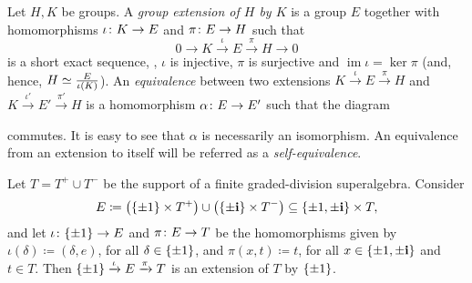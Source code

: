 \begin{defi}
	Let $H, K$ be groups.
	A \emph{group extension of $H$ by $K$} is a group $E$ together with homomorphisms $\iota\colon K \to E$ and $\pi\colon E \to H$ such that
	\begin{equation}\label{eq:short-exact-sequence}
		0 \rightarrow K \xrightarrow{\iota} E \xrightarrow{\pi} H \rightarrow 0
	\end{equation}
	is a short exact sequence, \ie,
	$\iota$ is injective, $\pi$ is surjective and $\operatorname{im} \iota = \ker \pi$ (and, hence, $H \simeq \frac{E}{\iota(K)}$).
	An \emph{equivalence} between two extensions $K \xrightarrow{\iota} E \xrightarrow{\pi} H$ and $K \xrightarrow{\iota'} E' \xrightarrow{\pi'} H$ is a homomorphism $\alpha\colon E \to E'$ such that the diagram
	\begin{center}
	\end{center}
	commutes.
	It is easy to see that $\alpha$ is necessarily an isomorphism.
	An equivalence from an extension to itself will be referred as a \emph{self-equivalence}.
\end{defi}

\begin{ex}\label{ex:main-extension}
    Let $T = T^+ \cup T^-$ be the support of a finite graded-division superalgebra.  Consider 
    \[
        E \coloneqq \big(\{ \pm 1 \} \times T^+\big) \cup \big(\{\pm \mathbf{i}\} \times T^-\big) \subseteq \{ \pm 1, \pm \mathbf{i} \} \times T,
    \] 
    and let $\iota\colon \{ \pm 1 \} \to E$ and $\pi\colon E \to T$ be the homomorphisms given by $\iota(\delta) \coloneqq (\delta, e)$, for all $\delta \in \{ \pm 1 \}$,  and $\pi (x, t) \coloneqq t$, for all $x \in \{ \pm 1, \pm \mathbf{i} \}$ and $t\in T$.
	Then $\{ \pm 1 \} \xrightarrow{\iota} E \xrightarrow{\pi} T$ is an extension of $T$ by $\{ \pm 1 \}$.
\end{ex}

